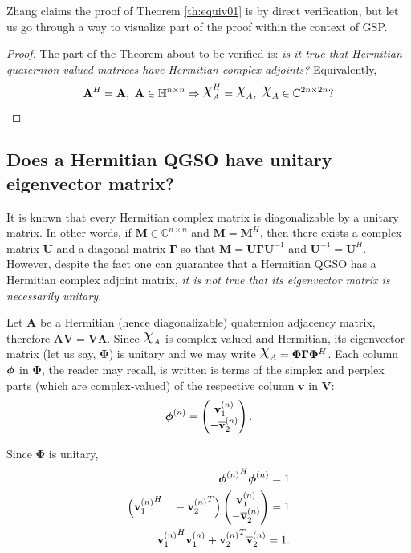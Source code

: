  Zhang claims the proof of Theorem \ref{th:equiv01} is by direct verification, but let us go through a way to visualize part of the proof within the context of GSP.
 
\begin{proof}
The part of the Theorem about to be verified is: \emph{is it true that Hermitian quaternion-valued matrices have Hermitian complex adjoints?} Equivalently,
\begin{equation}
\mathbf{A}^H = \mathbf{A}, \ \mathbf{A} \in \mathbb{H}^{n \times n} \Rightarrow
\rchi_{A}^H = \rchi_{A}, \ \rchi_{A} \in \mathbb{C}^{2n \times 2n}?
\end{equation}
\end{proof}

\subsection{Does a Hermitian QGSO have unitary eigenvector matrix?}

It is known that every Hermitian complex matrix is diagonalizable by a unitary matrix. In other words, if $\mathbf{M} \in \mathbb{C}^{n \times n}$ and $\mathbf{M} = \mathbf{M}^H$, then there exists a complex matrix $\mathbf{U}$ and a diagonal matrix $\mathbf{\Gamma}$ so that $\mathbf{M} = \mathbf{U} \mathbf{\Gamma} \mathbf{U}^{-1}$ and $\mathbf{U}^{-1} = \mathbf{U}^H$. However, despite the fact one can guarantee that a Hermitian QGSO has a Hermitian complex adjoint matrix, \textit{it is not true that its eigenvector matrix is necessarily unitary}.

Let $\mathbf{A}$ be a Hermitian (hence diagonalizable) quaternion adjacency matrix, therefore $\mathbf{A} \mathbf{V} = \mathbf{V} \mathbf{\Lambda}$. Since $\rchi_{A}$ is complex-valued and Hermitian, its eigenvector matrix (let us say, $\mathbf{\Phi}$) is unitary and we may write $\rchi_{A} = \mathbf{\Phi} \mathbf{\Gamma} \mathbf{\Phi}^H$. Each column $\mathbf{\boldsymbol{\phi}}$ in $\mathbf{\Phi}$, the reader may recall, is written is terms of the simplex and perplex parts (which are complex-valued) of the respective column $\mathbf{v}$ in $\mathbf{V}$:
\begin{equation}
\mathbf{\boldsymbol{\phi}}^{(n)} = 
\begin{pmatrix}
\mathbf{v}^{(n)}_1 \\ 
- \overline{\mathbf{v}}^{(n)}_2
\end{pmatrix}.
\end{equation}

Since $\mathbf{\Phi}$ is unitary,
\begin{equation}
\label{eq:phi_hermitian}
\begin{aligned}
{\mathbf{\boldsymbol{\phi}}^{(n)}}^H \mathbf{\boldsymbol{\phi}}^{(n)} = 1 \\
\Big({\mathbf{v}^{(n)}_1}^H \quad - {\mathbf{v}^{(n)}_2}^T \Big)
\begin{pmatrix}
\mathbf{v}^{(n)}_1 \\ 
- \overline{\mathbf{v}}^{(n)}_2
\end{pmatrix} = 1 \\
{\mathbf{v}^{(n)}_1}^H \mathbf{v}^{(n)}_1 + {\mathbf{v}^{(n)}_2}^T \overline{\mathbf{v}}^{(n)}_2 = 1.
\end{aligned}
\end{equation}


